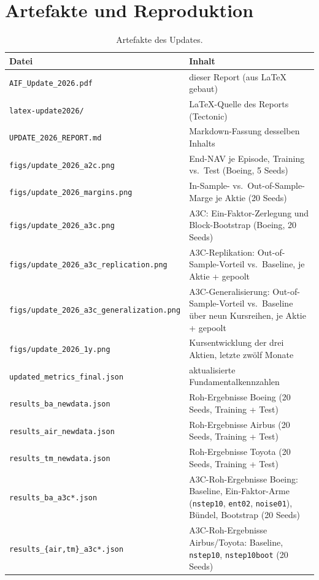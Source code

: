 \section{Artefakte und Reproduktion}

\begin{table}[H]
  \centering
  \caption{Artefakte des Updates.}
  \label{tab:artefakte}
  \small
  \begin{tabular}{ll}
    \toprule
    Datei & Inhalt\\
    \midrule
    \texttt{AIF\_Update\_2026.pdf} & dieser Report (aus LaTeX gebaut)\\
    \texttt{latex-update2026/} & LaTeX-Quelle des Reports (Tectonic)\\
    \texttt{UPDATE\_2026\_REPORT.md} & Markdown-Fassung desselben Inhalts\\
    \texttt{figs/update\_2026\_a2c.png}  & End-NAV je Episode, Training vs.\ Test (Boeing, 5 Seeds)\\
    \texttt{figs/update\_2026\_margins.png} & In-Sample- vs.\ Out-of-Sample-Marge je Aktie (20 Seeds)\\
    \texttt{figs/update\_2026\_a3c.png} & A3C: Ein-Faktor-Zerlegung und Block-Bootstrap (Boeing, 20 Seeds)\\
    \texttt{figs/update\_2026\_a3c\_replication.png} & A3C-Replikation: Out-of-Sample-Vorteil vs.\ Baseline, je Aktie + gepoolt\\
    \texttt{figs/update\_2026\_a3c\_generalization.png} & A3C-Generalisierung: Out-of-Sample-Vorteil vs.\ Baseline über neun Kursreihen, je Aktie + gepoolt\\
    \texttt{figs/update\_2026\_1y.png}   & Kursentwicklung der drei Aktien, letzte zwölf Monate\\
    \texttt{updated\_metrics\_final.json} & aktualisierte Fundamentalkennzahlen\\
    \texttt{results\_ba\_newdata.json}   & Roh-Ergebnisse Boeing (20 Seeds, Training + Test)\\
    \texttt{results\_air\_newdata.json}  & Roh-Ergebnisse Airbus (20 Seeds, Training + Test)\\
    \texttt{results\_tm\_newdata.json}   & Roh-Ergebnisse Toyota (20 Seeds, Training + Test)\\
    \texttt{results\_ba\_a3c*.json}   & A3C-Roh-Ergebnisse Boeing: Baseline, Ein-Faktor-Arme (\texttt{nstep10}, \texttt{ent02}, \texttt{noise01}), B\"undel, Bootstrap (20 Seeds)\\
    \texttt{results\_\{air,tm\}\_a3c*.json} & A3C-Roh-Ergebnisse Airbus/Toyota: Baseline, \texttt{nstep10}, \texttt{nstep10boot} (20 Seeds)\\

\end{tabular}
\end{table}
